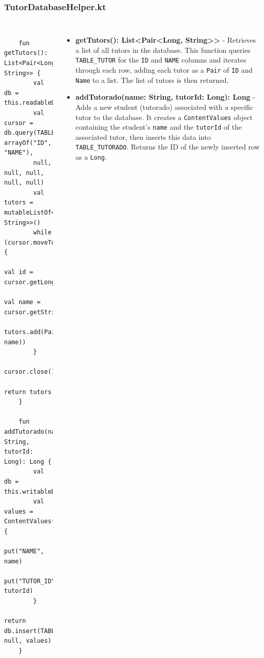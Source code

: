 \documentclass[pdf,
serif,
compress,
xcolor=table,
dvipsnames,
spanish,
aspectratio=169]{beamer}
\begin{document}
\begin{frame}[fragile]
    \frametitle{TutorDatabaseHelper.kt}
\begin{columns}
\begin{verbatim}

    fun getTutors(): List<Pair<Long, String>> {
        val db = this.readableDatabase
        val cursor = db.query(TABLE_TUTOR, arrayOf("ID", "NAME"), 
        null, null, null, null, null)
        val tutors = mutableListOf<Pair<Long, String>>()
        while (cursor.moveToNext()) {
            val id = cursor.getLong(cursor.getColumnIndexOrThrow("ID"))
            val name = cursor.getString(cursor.getColumnIndexOrThrow("NAME"))
            tutors.add(Pair(id, name))
        }
        cursor.close()
        return tutors
    }
    
    fun addTutorado(name: String, tutorId: Long): Long {
        val db = this.writableDatabase
        val values = ContentValues().apply {
            put("NAME", name)
            put("TUTOR_ID", tutorId)
        }
        return db.insert(TABLE_TUTORADO, null, values)
    }

\end{verbatim}

\begin{itemize}\tiny
    \item \textbf{getTutors(): List<Pair<Long, String>>} - Retrieves a list of all tutors in the database. This function queries \texttt{TABLE\_TUTOR} for the \texttt{ID} and \texttt{NAME} columns and iterates through each row, adding each tutor as a \texttt{Pair} of \texttt{ID} and \texttt{Name} to a list. The list of tutors is then returned.
    
    \item \textbf{addTutorado(name: String, tutorId: Long): Long} - Adds a new student (tutorado) associated with a specific tutor to the database. It creates a \texttt{ContentValues} object containing the student's \texttt{name} and the \texttt{tutorId} of the associated tutor, then inserts this data into \texttt{TABLE\_TUTORADO}. Returns the ID of the newly inserted row as a \texttt{Long}.
\end{itemize}


\end{columns}
\end{frame}

\end{document}
